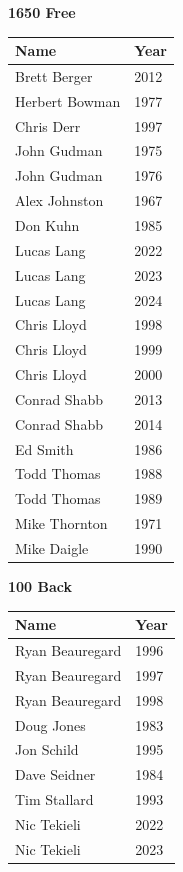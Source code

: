 \noindent\begin{minipage}[t]{0.48\textwidth}
\centering
\textbf{\textcolor{teamprimary}{1650 Free}}\par
\vspace{0.5em}
\centering
\small
\renewcommand{\arraystretch}{1.0}
\setlength{\tabcolsep}{4pt}
\begin{tabular}{@{}p{3.0cm}p{1.0cm}@{}}
\toprule
\textbf{Name} & \textbf{Year} \\
\midrule
Brett Berger & 2012 \\
Herbert Bowman & 1977 \\
Chris Derr & 1997 \\
John Gudman & 1975 \\
John Gudman & 1976 \\
Alex Johnston & 1967 \\
Don Kuhn & 1985 \\
Lucas Lang & 2022 \\
Lucas Lang & 2023 \\
Lucas Lang & 2024 \\
Chris Lloyd & 1998 \\
Chris Lloyd & 1999 \\
Chris Lloyd & 2000 \\
Conrad Shabb & 2013 \\
Conrad Shabb & 2014 \\
Ed Smith & 1986 \\
Todd Thomas & 1988 \\
Todd Thomas & 1989 \\
Mike Thornton & 1971 \\
Mike Daigle & 1990 \\
\bottomrule
\end{tabular}
\end{minipage}
\hfill
\begin{minipage}[t]{0.48\textwidth}
\centering
\textbf{\textcolor{teamprimary}{100 Back}}\par
\vspace{0.5em}
\centering
\small
\renewcommand{\arraystretch}{1.0}
\setlength{\tabcolsep}{4pt}
\begin{tabular}{@{}p{3.0cm}p{1.0cm}@{}}
\toprule
\textbf{Name} & \textbf{Year} \\
\midrule
Ryan Beauregard & 1996 \\
Ryan Beauregard & 1997 \\
Ryan Beauregard & 1998 \\
Doug Jones & 1983 \\
Jon Schild & 1995 \\
Dave Seidner & 1984 \\
Tim Stallard & 1993 \\
Nic Tekieli & 2022 \\
Nic Tekieli & 2023 \\
\bottomrule
\end{tabular}
\end{minipage}
